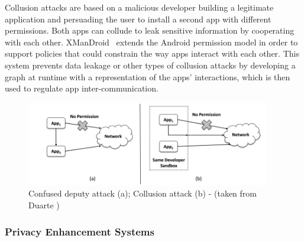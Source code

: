 Collusion attacks are based on a malicious developer building a legitimate application and persuading the user to install a second app with different permissions. Both apps can collude to leak sensitive information by cooperating with each other. XManDroid~\cite{bugiel2011xmandroid} extends the Android permission model in order to support policies that could constrain the way apps interact with each other. This system prevents data leakage or other types of collusion attacks by developing a graph at runtime with a representation of the apps’ interactions, which is then used to regulate app inter-communication.

\begin{figure}[t!]
	\centering
	\includegraphics[width=0.95\textwidth]{img/communicationattacks.png}
	\caption{Confused deputy attack (a); Collusion attack (b) - (taken from Duarte \cite{nunoduarte})}
	\label{fig:communicationattacks}
\end{figure}

\subsubsection{Privacy Enhancement Systems}


